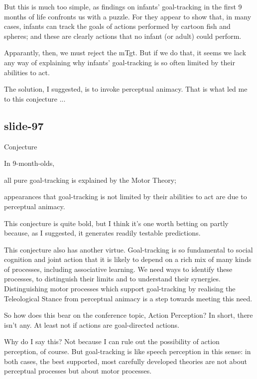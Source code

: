 \documentclass[12pt,\papersize]{extarticle}
\begin{document}
But this is much too simple, as
findings on infants’ goal-tracking in the first 9 months of life confronts us with a puzzle.
For they appear to show that, in many cases, infants can track the goals of actions 
performed by cartoon fish and spheres; and these are clearly actions that no infant (or adult)
could perform.
 
Apparantly, then, we must reject the mTgt. But if we do that, it seems we lack any way of 
explaining why infants’ goal-tracking is so often limited by their abilities to act.
 
The solution, I suggested, is to invoke perceptual animacy.
That is what led me to this conjecture ...
 
\subsection{slide-97}
Conjecture


          
In 9-month-olds,
          


          
all pure goal-tracking is explained by the Motor Theory;
          


          
appearances that goal-tracking is not limited by their abilities to act
are due to perceptual animacy.
          

 
This conjecture is quite bold, but I think it’s one worth betting on partly because,
as I suggested, it generates readily testable predictions.
 
This conjecture also has another virtue.
Goal-tracking is so fundamental to social cognition and joint action that it is 
likely to depend on a rich mix of many kinds of processes, including associative learning.
We need ways to identify these processes, to distinguish their limits and to understand their 
synergies.
Distinguishing motor processes which support goal-tracking by realising the Teleological Stance 
from perceptual animacy is a step towards meeting this need.
 
So how does this bear on the conference topic,
Action Perception?
In short, there isn’t any.
At least not if actions are goal-directed actions.
 
Why do I say this?  Not because I can rule out the possibility of action perception, of course.
But goal-tracking is like speech perception in this sense: in both cases, the best supported,
most carefully developed theories are not about perceptual processes but about motor processes.
 
\end{document}
